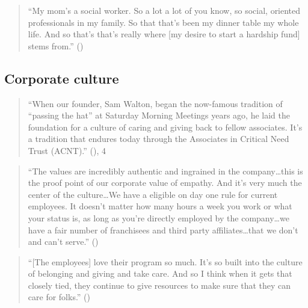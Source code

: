 \documentclass[
  11pt,
  oneside]{article}
\begin{document}
\begin{quote}
``My mom's a social worker. So a lot a lot of you know, so social, oriented professionals in my family. So that that's been my dinner table my whole life. And so that's that's really where {[}my desire to start a hardship fund{]} stems from.'' ()
\end{quote}

\subsection{Corporate culture}\label{corporate-culture}

\begin{quote}
``When our founder, Sam Walton, began the now-famous tradition of ``passing the hat'' at Saturday Morning Meetings years ago, he laid the foundation for a culture of caring and giving back to fellow associates. It's a tradition that endures today through the Associates in Critical Need Trust (ACNT).'' (), 4
\end{quote}

\begin{quote}
``The values are incredibly authentic and ingrained in the company\ldots this is the proof point of our
corporate value of empathy. And it's very much the center of the culture\ldots We have a eligible on day one rule for current employees. It doesn't matter how many hours a week you work or what your status is, as long as you're directly employed by the company\ldots we have a fair number of franchisees and third party affiliates\ldots that we don't and can't serve.'' ()
\end{quote}

\begin{quote}
``{[}The employees{]} love their program so much. It's so built into the culture of belonging and giving and take care. And so I think when it gets that closely tied, they continue to give resources to make sure that they can care for folks.'' ()
\end{quote}
\end{document}
